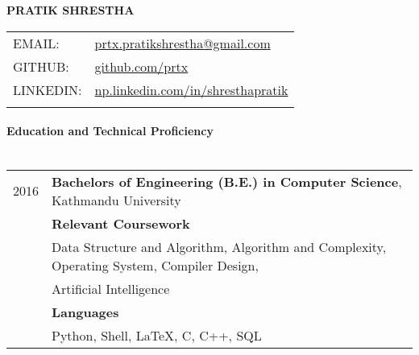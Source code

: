 \documentclass[letterpaper,10pt,oneside]{article}
\begin{document}

\noindent  \textbf{\Large{PRATIK SHRESTHA}}\\
\vspace{-2ex}
\hline
\normalsize


\begin{tabular}{l l}
 \\
 EMAIL: & \href{mailto:prtx.pratikshrestha@gmail.com}{prtx.pratikshrestha@gmail.com} \\
 GITHUB: & \href{http://github.com/prtx}{github.com/prtx} \\
 LINKEDIN: & \href{http://np.linkedin.com/in/shresthapratik}{np.linkedin.com/in/shresthapratik} \\\\
\end{tabular}

\hline
\vspace{0em}


\paragraph{\large{Education and Technical Proficiency}\\\\}
\noindent \begin{tabular}{l l}
 2016    & \textbf{Bachelors of Engineering (B.E.) in Computer Science}, Kathmandu University\\
     & \textbf{Relevant Coursework} \\
     & Data Structure and Algorithm, Algorithm and Complexity, Operating System, Compiler Design, \\
     & Artificial Intelligence \\
     & \textbf{Languages} \\
     & Python, Shell, \LaTeX, C, C++, SQL
     
\end{tabular}
\end{document}
